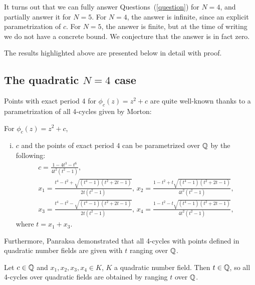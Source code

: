 It turns out that we can fully answer Questions~(\ref{question}) for
$N = 4$, and partially answer it for $N = 5$. For $N = 4$, the answer
is infinite, since an explicit parametrization of $c$. For $N =
5$, the answer is finite, but at the time of writing we do not have a
concrete bound. We conjecture that the answer is in fact zero.

The results highlighted above are presented below in detail with
proof.

\subsection{The quadratic $N = 4$ case}

Points with exact period 4 for $\phi_c(z) = z^2 + c$ are quite 
well-known thanks to a parametrization of all 4-cycles given by
Morton:

\begin{theorem} 
  For $\phi_c(z) = z^2 + c$,
  \begin{enumerate}[(i)]
  \item $c$ and the points of exact period 4 can be parametrized over
    $\mathbb{Q}$ by the following:
    \[
    \begin{gathered}
      c = \frac{1 - 4t^3 - t^6}{4t^2(t^2 - 1)}, \\
      x_1 = \frac{t^4 - t^2 + \sqrt{(t^4 - 1)(t^2 + 2t - 1)}}{2t(t^2 -
        1)},\,
      x_2 = \frac{1 - t^2 + t \sqrt{(t^4 - 1)(t^2 + 2t - 1)}}{4t^2(t^2
        - 1)}, \\
      x_3 = \frac{t^4 - t^2 - \sqrt{(t^4 - 1)(t^2 + 2t - 1)}}{2t(t^2 -
        1)},\,
      x_4 = \frac{1 - t^2 - t \sqrt{(t^4 - 1)(t^2 + 2t - 1)}}{4t^2(t^2
        - 1)},
  \end{gathered}
  \]
  where $t = x_1 + x_3$.

  \end{enumerate}
\end{theorem}

Furthermore, Panraksa demonstrated that all 4-cycles with points
defined in quadratic number fields are given with $t$ ranging over
$\mathbb{Q}$.

\begin{theorem} 
	Let $c \in \mathbb{Q}$ and $x_1, x_2, x_3, x_4 \in K$, $K$ a quadratic 
	number field. Then $t \in \mathbb{Q}$, so all 4-cycles over quadratic
	fields are obtained by ranging $t$ over $\mathbb{Q}$.
\end{theorem}

